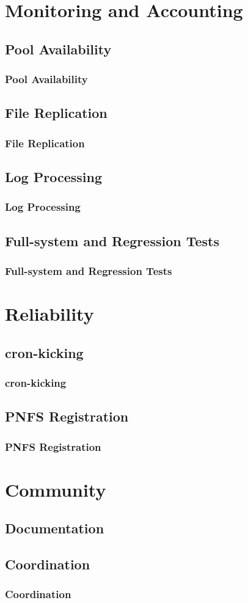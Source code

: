 \documentclass{beamer}
\begin{document}
\section{Monitoring and Accounting}
\subsection{Pool Availability}
\begin{frame}
\frametitle{Pool Availability}
\end{frame}

\subsection{File Replication}
\begin{frame}
\frametitle{File Replication}
\end{frame}

\subsection{Log Processing}
\begin{frame}
\frametitle{Log Processing}
\end{frame}

\subsection[Testing]{Full-system and Regression Tests}
\begin{frame}
\frametitle{Full-system and Regression Tests}
\end{frame}

\section{Reliability}
\subsection{cron-kicking}
\begin{frame}
\frametitle{cron-kicking}
\end{frame}

\subsection{PNFS Registration}
\begin{frame}
\frametitle{PNFS Registration}
\end{frame}

\section{Community}
\subsection{Documentation}
\begin{frame}
\frametitle{}
\end{frame}

\subsection{Coordination}
\begin{frame}
\frametitle{Coordination}
\end{frame}
\end{document}
